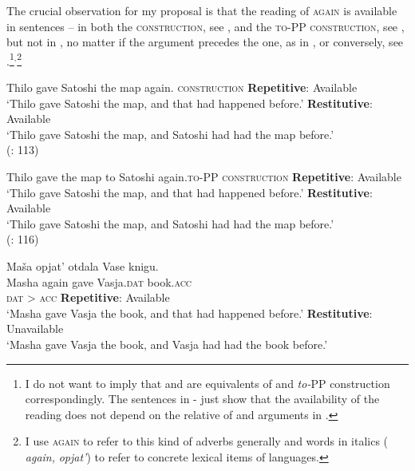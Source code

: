 \documentclass[output=paper]{langscibook}
\begin{document}
\largerpage[-1]
The crucial observation for my proposal is that the  reading of \textsc{again} is available in   sentences -- in both the \textsc{ construction}, see , and the \textsc{to-PP construction}, see , but not in , no matter if the  argument precedes the  one, as in , or conversely, see .\footnote{I do not want to imply that  and  are equivalents of   and \textit{to-}PP construction correspondingly. The sentences in - just show that the availability of the  reading does not depend on the relative  of  and  arguments in .}$^,$\footnote{I use \textsc{again} to refer to this kind of  adverbs generally and words in italics ( \textit{again,}  \textit{opjat’}) to refer to concrete lexical items of languages.}


 \ea\label{ex:bondarenko:3}{Thilo gave Satoshi the map again.}\hfill\textsc{ construction}
\ea \textbf{Repetitive}: Available\\`Thilo gave Satoshi the map, and that had happened before.'
\ex \textbf{Restitutive}: Available\\`Thilo gave Satoshi the map, and Satoshi had had the map before.'\\
\hfill(\citealt{Beck-Johnson2004}: 113)
\z
\z

 \ea\label{ex:bondarenko:4}{Thilo gave the map to Satoshi again.}\hfill\textsc{to-PP construction}
\ea \textbf{Repetitive}: Available\\`Thilo gave Satoshi the map, and that had happened before.'
\ex \textbf{Restitutive}: Available\\`Thilo gave Satoshi the map, and Satoshi had had the map  before.'\\
\hfill (\citealt{Beck-Johnson2004}: 116)
\z
\z

 \ea\label{ex:bondarenko:5}
\gll Maša opjat’ otdala Vase knigu.\\
     Masha again gave Vasja.\textsc{dat} book.\textsc{acc}\\\hfill\textsc{dat} > \textsc{acc}
\ea \textbf{Repetitive}: Available\\`Masha gave Vasja the book, and that had happened before.'
\ex \textbf{Restitutive}: Unavailable\\`Masha gave Vasja the book, and Vasja had had the book   before.'
\z
\z
\end{document}
